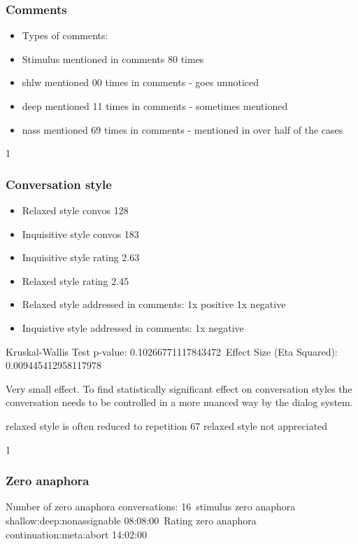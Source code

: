 \subsubsection{Comments}

\begin{itemize}
\item Types of comments:
\item Stimulus mentioned in comments 80 times
\item shlw mentioned 00 times in comments - goes unnoticed
\item deep mentioned 11 times in comments - sometimes mentioned
\item nass mentioned 69 times in comments - mentioned in over half of the cases
\end{itemize}

1
\subsubsection{Conversation style}

\begin{itemize}
\item Relaxed style convos 128
\item Inquisitive style convos 183
\item Inquisitive style rating 2.63
\item Relaxed style rating 2.45
\item Relaxed style addressed in comments: 1x positive 1x negative
\item Inquistive style addressed in comments: 1x negative
\end{itemize}

Kruskal-Wallis Test p-value: 0.10266771117843472\
Effect Size (Eta Squared): 0.009445412958117978

Very small effect.
To find statistically significant effect on conversation styles
the conversation needs to be controlled in a more nuanced way by the dialog system.

relaxed style is often reduced to repetition
67 relaxed style not appreciated

1
\subsubsection{Zero anaphora}

Number of zero anaphora conversations: 16\
stimulus zero anaphora shallow:deep:nonassignable 08:08:00\
Rating zero anaphora continuation:meta:abort 14:02:00

